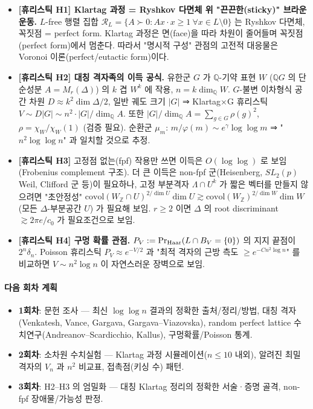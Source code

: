 \begin{itemize}
\tightlist
\item
  \textbf{{[}휴리스틱 H1{]} Klartag 과정 = Ryshkov 다면체 위 "끈끈한(sticky)" 브라운 운동.} \(L\)-free 행렬 집합 \(\mathcal R_L=\{A\succ0: Ax\cdot x\ge1\ \forall x\in L\setminus0\}\) 는 Ryshkov 다면체, 꼭짓점 = perfect form. Klartag 과정은 면(face)을 따라 차원이 줄어들며 꼭짓점(perfect form)에서 멈춘다. 따라서 "명시적 구성" 관점의 고전적 대응물은 Voronoi 이론(perfect/eutactic form)이다.
\item
  \textbf{{[}휴리스틱 H2{]} 대칭 격자족의 이득 공식.} 유한군 \(G\) 가 \(\mathbb Q\)-기약 표현 \(W\) (\(\mathbb QG\) 의 단순성분 \(A=M_r(\Delta)\)) 의 \(k\) 겹 \(W^k\) 에 작용, \(n=k\dim_{\mathbb Q}W\). \(G\)-불변 이차형식 공간 차원 \(D\approx k^2\dim\Delta/2\), 일반 궤도 크기 \(|G|\) ⇒ Klartag×G 휴리스틱 \(V\sim D|G|\sim n^2\cdot|G|/\dim_{\mathbb Q}A\). 또한 \(|G|/\dim_{\mathbb Q}A=\sum_{g\in G}\rho(g)^2\), \(\rho=\chi_W/\chi_W(1)\) (검증 필요). 순환군 \(\mu_m\): \(m/\varphi(m)\sim e^\gamma\log\log m\) ⇒ "\(n^2\log\log n\)" 과 일치할 것으로 추정.
\item
  \textbf{{[}휴리스틱 H3{]}} 고정점 없는(fpf) 작용만 쓰면 이득은 \(O(\log\log)\) 로 보임(Frobenius complement 구조). 더 큰 이득은 non-fpf 군(Heisenberg, \(SL_2(p)\) Weil, Clifford 군 등)이 필요하나, 고정 부분격자 \(\Lambda\cap U^k\) 가 짧은 벡터를 만들지 않으려면 "초안정성" \(\mathrm{covol}(W_\mathbb Z\cap U)^{2/\dim U}\dim U\gtrsim \mathrm{covol}(W_\mathbb Z)^{2/\dim W}\dim W\) (모든 \(\Delta\)-부분공간 \(U\)) 가 필요해 보임. \(r\ge2\) 이면 \(\Delta\) 의 root discriminant \(\gtrsim 2\pi e/c_0\) 가 필요조건으로 보임.
\item
  \textbf{{[}휴리스틱 H4{]} 구멍 확률 관점.} \(P_V:=\Pr_{\rm Haar}(L\cap B_V=\{0\})\) 의 지지 끝점이 \(2^n\delta_n\). Poisson 휴리스틱 \(P_V\approx e^{-V/2}\) 과 "최적 격자의 근방 측도 \(\ge e^{-Cn^2\log n}\)" 를 비교하면 \(V\sim n^2\log n\) 이 자연스러운 장벽으로 보임.
\end{itemize}

\hypertarget{uxb2e4uxc74c-uxd68cuxcc28-uxacc4uxd68d}{%
\paragraph{다음 회차 계획}\label{uxb2e4uxc74c-uxd68cuxcc28-uxacc4uxd68d}}

\begin{itemize}
\tightlist
\item
  \textbf{1회차}: 문헌 조사 --- 최신 \(\log\log n\) 결과의 정확한 출처/정리/방법, 대칭 격자(Venkatesh, Vance, Gargava, Gargava--Viazovska), random perfect lattice 수치연구(Andreanov--Scardicchio, Kallus), 구멍확률/Poisson 통계.
\item
  \textbf{2회차}: 소차원 수치실험 --- Klartag 과정 시뮬레이션(\(n\le 10\) 내외), 알려진 최밀 격자의 \(V_n\) 과 \(n^2\) 비교표, 접촉점(키싱 수) 패턴.
\item
  \textbf{3회차}: H2--H3 의 엄밀화 --- 대칭 Klartag 정리의 정확한 서술·증명 골격, non-fpf 장애물/가능성 판정.
\end{itemize}

